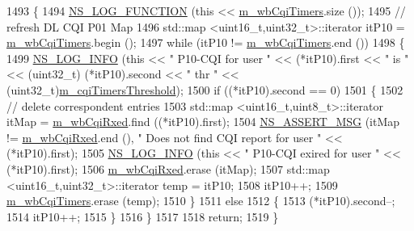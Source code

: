 \begin{DoxyCode}
1493 \{
1494   \hyperlink{log-macros-disabled_8h_a90b90d5bad1f39cb1b64923ea94c0761}{NS\_LOG\_FUNCTION} (\textcolor{keyword}{this} << \hyperlink{classns3_1_1MmWaveFlexTtiMaxWeightMacScheduler_ae5d8e61af9fd27ffd79a17f068267f42}{m\_wbCqiTimers}.size ());
1495   \textcolor{comment}{// refresh DL CQI P01 Map}
1496   std::map <uint16\_t,uint32\_t>::iterator itP10 = \hyperlink{classns3_1_1MmWaveFlexTtiMaxWeightMacScheduler_ae5d8e61af9fd27ffd79a17f068267f42}{m\_wbCqiTimers}.begin ();
1497   \textcolor{keywordflow}{while} (itP10 != \hyperlink{classns3_1_1MmWaveFlexTtiMaxWeightMacScheduler_ae5d8e61af9fd27ffd79a17f068267f42}{m\_wbCqiTimers}.end ())
1498     \{
1499       \hyperlink{group__logging_gafbd73ee2cf9f26b319f49086d8e860fb}{NS\_LOG\_INFO} (\textcolor{keyword}{this} << \textcolor{stringliteral}{" P10-CQI for user "} << (*itP10).first << \textcolor{stringliteral}{" is "} << (uint32\_t)
      (*itP10).second << \textcolor{stringliteral}{" thr "} << (uint32\_t)\hyperlink{classns3_1_1MmWaveFlexTtiMaxWeightMacScheduler_a12853e0079042ba54793594532d1ef15}{m\_cqiTimersThreshold});
1500       \textcolor{keywordflow}{if} ((*itP10).second == 0)
1501         \{
1502           \textcolor{comment}{// delete correspondent entries}
1503           std::map <uint16\_t,uint8\_t>::iterator itMap = \hyperlink{classns3_1_1MmWaveFlexTtiMaxWeightMacScheduler_a46c51259ff3607f3ef2f4684485f274c}{m\_wbCqiRxed}.find ((*itP10).first);
1504           \hyperlink{assert_8h_aff5ece9066c74e681e74999856f08539}{NS\_ASSERT\_MSG} (itMap != \hyperlink{classns3_1_1MmWaveFlexTtiMaxWeightMacScheduler_a46c51259ff3607f3ef2f4684485f274c}{m\_wbCqiRxed}.end (), \textcolor{stringliteral}{" Does not find CQI report
       for user "} << (*itP10).first);
1505           \hyperlink{group__logging_gafbd73ee2cf9f26b319f49086d8e860fb}{NS\_LOG\_INFO} (\textcolor{keyword}{this} << \textcolor{stringliteral}{" P10-CQI exired for user "} << (*itP10).first);
1506           \hyperlink{classns3_1_1MmWaveFlexTtiMaxWeightMacScheduler_a46c51259ff3607f3ef2f4684485f274c}{m\_wbCqiRxed}.erase (itMap);
1507           std::map <uint16\_t,uint32\_t>::iterator temp = itP10;
1508           itP10++;
1509           \hyperlink{classns3_1_1MmWaveFlexTtiMaxWeightMacScheduler_ae5d8e61af9fd27ffd79a17f068267f42}{m\_wbCqiTimers}.erase (temp);
1510         \}
1511       \textcolor{keywordflow}{else}
1512         \{
1513           (*itP10).second--;
1514           itP10++;
1515         \}
1516     \}
1517 
1518   \textcolor{keywordflow}{return};
1519 \}
\end{DoxyCode}


